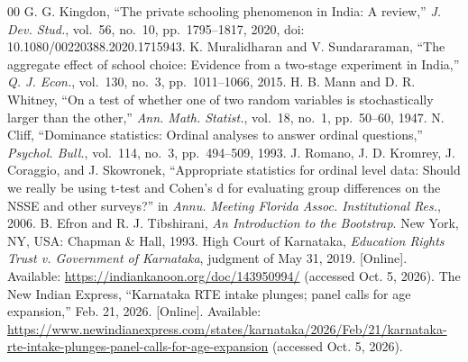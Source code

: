 \documentclass[conference]{IEEEtran}
\begin{document}
\begin{thebibliography}{00}
 G. G. Kingdon, ``The private schooling phenomenon in India: A review,'' \textit{J. Dev. Stud.}, vol.~56, no.~10, pp.~1795--1817, 2020, doi: 10.1080/00220388.2020.1715943.
 K. Muralidharan and V. Sundararaman, ``The aggregate effect of school choice: Evidence from a two-stage experiment in India,'' \textit{Q. J. Econ.}, vol.~130, no.~3, pp.~1011--1066, 2015.
 H. B. Mann and D. R. Whitney, ``On a test of whether one of two random variables is stochastically larger than the other,'' \textit{Ann. Math. Statist.}, vol.~18, no.~1, pp.~50--60, 1947.
 N. Cliff, ``Dominance statistics: Ordinal analyses to answer ordinal questions,'' \textit{Psychol. Bull.}, vol.~114, no.~3, pp.~494--509, 1993.
 J. Romano, J. D. Kromrey, J. Coraggio, and J. Skowronek, ``Appropriate statistics for ordinal level data: Should we really be using t-test and Cohen's d for evaluating group differences on the NSSE and other surveys?'' in \textit{Annu. Meeting Florida Assoc. Institutional Res.}, 2006.
 B. Efron and R. J. Tibshirani, \textit{An Introduction to the Bootstrap}. New York, NY, USA: Chapman \& Hall, 1993.
 High Court of Karnataka, \textit{Education Rights Trust v. Government of Karnataka}, judgment of May 31, 2019. [Online]. Available: \url{https://indiankanoon.org/doc/143950994/} (accessed Oct. 5, 2026).
 The New Indian Express, ``Karnataka RTE intake plunges; panel calls for age expansion,'' Feb. 21, 2026. [Online]. Available: \url{https://www.newindianexpress.com/states/karnataka/2026/Feb/21/karnataka-rte-intake-plunges-panel-calls-for-age-expansion} (accessed Oct. 5, 2026).
\end{thebibliography}
\end{document}
